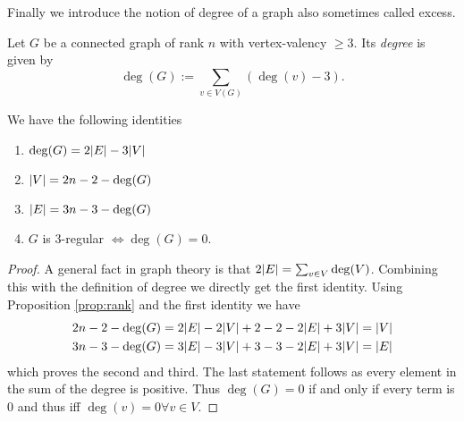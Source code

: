 Finally we introduce the notion of degree of a graph also sometimes called excess.
\begin{definition}
	Let $G$ be a connected graph of rank $n$ with vertex-valency $\geq 3$. Its \emph{degree} is given by
	\[
		\deg(G) := \sum_{v \in V(G)} (\deg(v) - 3)
	.\] 
\end{definition}

\begin{proposition}
	We have the following identities
	\begin{enumerate}
		\item $\deg(G) = 2 \abs{E} - 3 \abs{V}$
		\item $\abs{V} = 2n -2 - \deg(G)$
		\item $\abs{E} = 3n - 3 - \deg(G)$
		\item $G$ is $3$-regular $\Leftrightarrow \deg(G) = 0$.
	\end{enumerate}	
\end{proposition}

\begin{proof}
	A general fact in graph theory is that $2 \abs{E} = \sum_{v \in V} \deg(V)$.
	Combining this with the definition of degree we directly get the first identity.
	Using Proposition \ref{prop:rank} and the first identity we have
	\begin{align*}
		2 n -2 - \deg(G) &= 2 \abs{E} - 2 \abs{V} + 2 - 2 - 2\abs{E} + 3 \abs{V} = \abs{V}\\
		3 n -3 - \deg(G) &= 3 \abs{E} - 3 \abs{V} + 3 - 3 - 2\abs{E} + 3 \abs{V} = \abs{E}
	\end{align*}
	which proves the second and third. The last statement follows as every element in the sum of the degree is positive.
	Thus $\deg(G) = 0$ if and only if every term is $0$ and thus iff $\deg(v) = 0 \forall v \in V$.
\end{proof}

